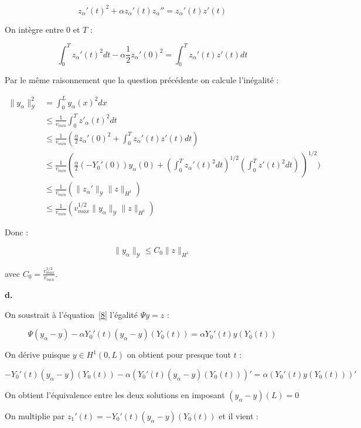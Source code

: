\documentclass[a4paper]{article}
\newcommand{\Y}{\mathscr{Y}}
\begin{document}
\[ z_{\alpha}'(t)^2 + \alpha z_{\alpha}'(t) z_{\alpha}'' = z_{\alpha}'(t)z'(t) \]

On intègre entre $0$ et $T$ :

\[ \displaystyle  \int_0^T z_\alpha '(t)^2 dt - \alpha \frac{1}{2}z_\alpha '(0)^2
          =  \int_0^T z_\alpha '(t)z'(t)dt \]

Par le même raisonnement que la question précédente on calcule l'inégalité :

\[
\begin{split}
\| y_{\alpha} \|_{\mathscr{Y}}^2 &= \int_0^L y_\alpha(x)^2dx \\
	     & \leq \displaystyle \frac{1}{v_{min}} \int_0^T z'_{\alpha}(t)^2dt\\
	     &\leq \displaystyle \frac{1}{v_{min}}
				 ( \frac{\alpha}{2} z_\alpha '(0)^2 
				 	+ \int_0^T z_\alpha '(t)z'(t)dt) \\
		 & \leq \displaystyle \frac{1}{v_{min}}
			(\frac{\alpha}{2}  (-Y_0'(0)) y_\alpha (0)
			+ (\int_0^T z_\alpha'(t)^2 dt)^{1/2}
			 (\int_0^Tz'(t)^2 dt)\,)^{1/2} ) \\
		&\leq \displaystyle \frac{1}{v_{min}}
			(\| z_\alpha'\|_{\Y} \| z \|_{H^1} ) \\
		& \leq \displaystyle \frac{1}{v_{min}}
			( v_{max}^{1/2} \| y_\alpha \|_{\Y} \| z \|_{H^1} ) 
\end{split}
\]

Donc :

\[ \| y_{\alpha} \|_{\mathscr{Y}} \leq \displaystyle C_0
                                                     \| z \|_{H^1} \]

avec $C_0= \displaystyle \frac{ v_{max}^{1/2} }{ v_{min}}$.


\vspace{0.3cm}
\textbf{d.}

On soustrait à l'équation~\eqref{8} 
l'égalité $\Psi y = z$ :

\[
\Psi (y_\alpha - y) - \alpha Y_0'(t)(y_\alpha - y)(Y_0(t)) = \alpha Y_0'(t) y(Y_0(t))
\]

On dérive puisque $y \in H^1(0,L)$ on obtient pour presque tout $t$ :

 \[
 - Y_0'(t)(y_\alpha - y)(Y_0(t)) - \alpha (Y_0'(t)(y_\alpha - y)(Y_0(t)))' = \alpha (Y_0'(t) y(Y_0(t)))'
 \]
 
 On obtient l'équivalence entre les deux solutions en imposant $(y_\alpha - y)(L)=0$
 
 On multiplie par $z_1'(t) =  - Y_0'(t)(y_\alpha - y)(Y_0(t)) $ et il vient :
 
\end{document}
